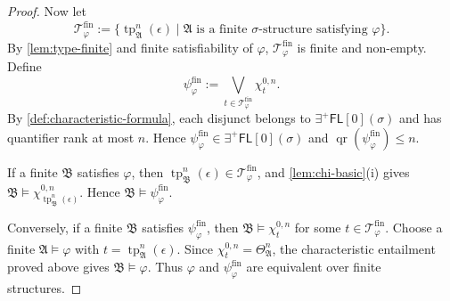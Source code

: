 \documentclass[10pt,a4paper]{amsart}
\newcommand{\A}{\mathfrak{A}}
\newcommand{\B}{\mathfrak{B}}
\newcommand{\EPFL}{\exists^{+}\!\mathsf{FL}}
\newcommand{\qr}{\operatorname{qr}}
\newcommand{\tp}{\operatorname{tp}}
\begin{document}
\begin{proof}
Now let
\[
  \mathcal T_{\varphi}^{\mathrm{fin}}
  :=
  \bigl\{
    \tp_{\A}^{n}(\epsilon)
    \mid
    \A\text{ is a finite $\sigma$-structure satisfying }\varphi
  \bigr\}.
\]
By \cref{lem:type-finite} and finite satisfiability of $\varphi$,
$\mathcal T_{\varphi}^{\mathrm{fin}}$ is finite and non-empty.  Define
\[
  \psi_{\varphi}^{\mathrm{fin}}
  :=
  \bigvee_{t\in\mathcal T_{\varphi}^{\mathrm{fin}}}\chi_t^{0,n}.
\]
By \cref{def:characteristic-formula}, each disjunct belongs to
$\EPFL[0](\sigma)$ and has quantifier rank at most $n$.  Hence
$\psi_{\varphi}^{\mathrm{fin}}\in\EPFL[0](\sigma)$ and
$\qr(\psi_{\varphi}^{\mathrm{fin}})\leq n$.

If a finite $\B$ satisfies $\varphi$, then
$\tp_{\B}^{n}(\epsilon)\in\mathcal T_{\varphi}^{\mathrm{fin}}$, and
\cref{lem:chi-basic}(i) gives
$\B\models\chi_{\tp_{\B}^{n}(\epsilon)}^{0,n}$.  Hence
$\B\models\psi_{\varphi}^{\mathrm{fin}}$.

Conversely, if a finite $\B$ satisfies $\psi_{\varphi}^{\mathrm{fin}}$, then
$\B\models\chi_t^{0,n}$ for some
$t\in\mathcal T_{\varphi}^{\mathrm{fin}}$.  Choose a finite
$\A\models\varphi$ with $t=\tp_{\A}^{n}(\epsilon)$.  Since
$\chi_t^{0,n}=\Theta_{\A}^{n}$, the characteristic entailment proved above
gives $\B\models\varphi$.  Thus $\varphi$ and
$\psi_{\varphi}^{\mathrm{fin}}$ are equivalent over finite structures.
\end{proof}
\end{document}
